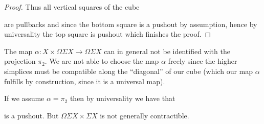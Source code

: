 \begin{lemma}
\begin{proof}
        Thus all vertical squares of the cube
        \begin{center}
        \end{center}
        are pullbacks and since the bottom square is a pushout by assumption, hence by universality the top square is pushout which finishes the proof.
    \end{proof}
\end{lemma}
\begin{remark}\label{rmk:mapNotProj}
    The map $\alpha\colon X\times\Omega\Sigma X\to\Omega\Sigma X$ can in general not be identified with the projection $\pi_2$.
    We are not able to choose the map $\alpha$ freely since the higher simplices must be compatible along the ``diagonal'' of our cube (which our map $\alpha$ fulfills by construction, since it is a universal map).

    If we assume $\alpha=\pi_2$ then by universality we have that 
    \begin{center}
    \end{center}
    is a pushout.
    But $\Omega\Sigma X\times \Sigma X$ is not generally contractible. 
\end{remark}
